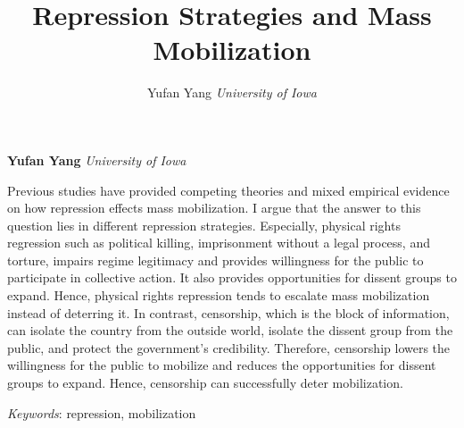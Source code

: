 \documentclass[11pt,]{article}
\title{Repression Strategies and Mass Mobilization }
\author{\Large Yufan Yang\vspace{0.05in} \newline\normalsize\emph{University of Iowa}  }
\date{}
\newcommand*{\authorfont}{\fontfamily{phv}\selectfont}
\renewenvironment{abstract}
 {{%
    \setlength{\leftmargin}{0mm}
    \setlength{\rightmargin}{\leftmargin}%
  }%
  \relax}
 {\endlist}
\begin{document}
	
%

{%
\setlength{\parindent}{0pt}
\thispagestyle{plain}
{\fontsize{18}{20}\selectfont\raggedright 
\maketitle  %

}

{
   \vskip 13.5pt\relax \normalsize\fontsize{11}{12} 
\textbf{\authorfont Yufan Yang} \hskip 15pt \emph{\small University of Iowa}   

}

}








\begin{abstract}

    \hbox{\vrule height .2pt width 39.14pc}

    \vskip 8.5pt %

\noindent Previous studies have provided competing theories and mixed empirical
evidence on how repression effects mass mobilization. I argue that the
answer to this question lies in different repression strategies.
Especially, physical rights regression such as political killing,
imprisonment without a legal process, and torture, impairs regime
legitimacy and provides willingness for the public to participate in
collective action. It also provides opportunities for dissent groups to
expand. Hence, physical rights repression tends to escalate mass
mobilization instead of deterring it. In contrast, censorship, which is
the block of information, can isolate the country from the outside
world, isolate the dissent group from the public, and protect the
government's credibility. Therefore, censorship lowers the willingness
for the public to mobilize and reduces the opportunities for dissent
groups to expand. Hence, censorship can successfully deter mobilization.


\vskip 8.5pt \noindent \emph{Keywords}: repression, mobilization \par

    \hbox{\vrule height .2pt width 39.14pc}



\end{abstract}
\end{document}

